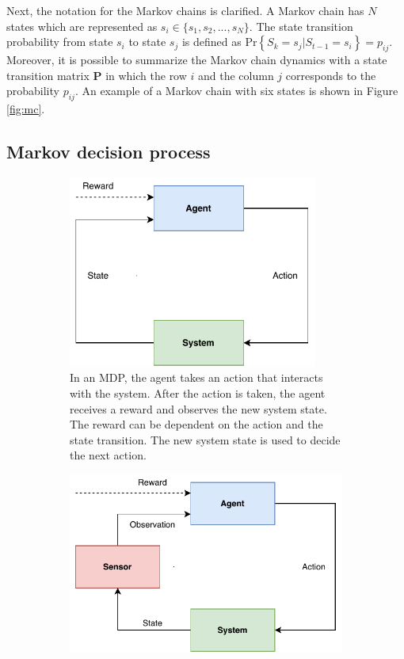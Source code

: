 \documentclass[english, 12pt, a4paper, elec, utf8, a-1b, online]{aaltothesis}
\renewcommand{\Pr}[1]{\text{Pr}\left\{ #1 \right\}}
\renewcommand{\vec}[1]{\mathbf{#1}}
\newcommand{\stprobs}{\vec{P}}
\begin{document}
Next, the notation for the Markov chains is clarified.
A Markov chain has $N$ states which are represented as $s_i \in \{s_1, s_2, ..., s_N\}$.
The state transition probability from state $s_i$ to state $s_j$ is defined as $\Pr{S_k=s_j | S_{t-1}=s_i}=p_{ij}$.
Moreover, it is possible to summarize the Markov chain dynamics with a state transition matrix $\stprobs$ in which the row $i$ and the column $j$ corresponds to the probability $p_{ij}$.
An example of a Markov chain with six states is shown in Figure \ref{fig:mc}.

\subsection{Markov decision process} \label{sec:MDP}

\begin{figure}
    \centering
    \begin{subfigure}[b]{0.45\textwidth}
        \centering
        \includegraphics[width=0.9\textwidth]{figures/MDP.pdf}
        \caption{
        In an MDP, the agent takes an action that interacts with the system.
        After the action is taken, the agent receives a reward and observes the new system state.
        The reward can be dependent on the action and the state transition.
        The new system state is used to decide the next action.}
        \label{fig:mdp}
    \end{subfigure}
    \hfill
    \begin{subfigure}[b]{0.45\textwidth}
        \centering
        \includegraphics[width=\textwidth]{figures/POMDP.pdf}

\end{subfigure}
\end{figure}
\end{document}
